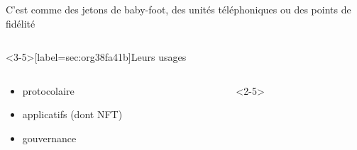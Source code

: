 \documentclass[presentation]{beamer}
\begin{document}
\begin{frame}[label={sec:org4728df8}]{C'est comme des jetons de baby-foot, des unités téléphoniques ou des points de fidélité}
\begin{columns}
\begin{column}{0.38\columnwidth}
\begin{block}
\begin{center}
\end{center}
\end{block}
\end{column}
\end{columns}
\end{frame}

\begin{frame}<3-5>[label={sec:org38fa41b}]{Leurs usages}
\begin{columns}
\begin{column}{0.43\columnwidth}
\begin{block}{}
\begin{itemize}
\item <3->protocolaire
\item <4->applicatifs (dont NFT)
\item <5->gouvernance
\end{itemize}
\end{block}
\end{column}
\begin{column}{0.43\columnwidth}
\begin{block}<2-5>{}
\end{block}
\end{column}
\end{columns}
\end{frame}
\end{document}
